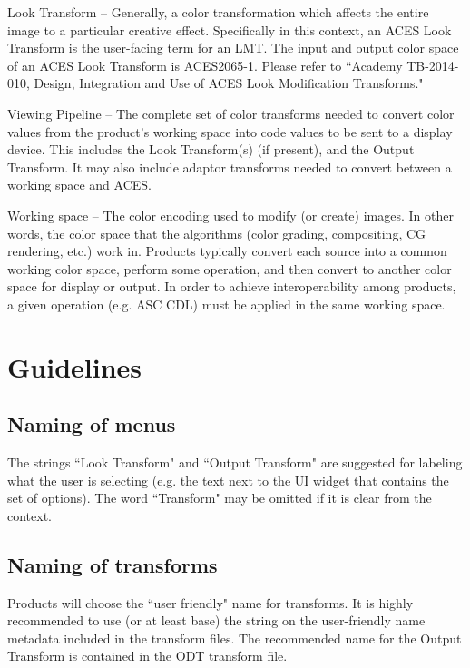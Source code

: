 Look Transform -- Generally, a color transformation which affects the entire image to a particular creative effect. Specifically in this context, an ACES Look Transform is the user-facing term for an LMT. The input and output color space of an ACES Look Transform is ACES2065-1. Please refer to ``Academy TB-2014-010, Design, Integration and Use of ACES Look Modification Transforms."

Viewing Pipeline -- The complete set of color transforms needed to convert color values from the product’s working space into code values to be sent to a display device. This includes the Look Transform(s) (if present), and the Output Transform. It may also include adaptor transforms needed to convert between a working space and ACES.

Working space -- The color encoding used to modify (or create) images. In other words, the color space that the algorithms (color grading, compositing, CG rendering, etc.) work in. Products typically convert each source into a common working color space, perform some operation, and then convert to another color space for display or output. In order to achieve interoperability among products, a given operation (e.g. ASC CDL) must be applied in the same working space.



\section{Guidelines}
\subsection{Naming of menus}
The strings ``Look Transform" and ``Output Transform" are suggested for labeling what the user is selecting (e.g. the text next to the UI widget that contains the set of options). The word ``Transform" may be omitted if it is clear from the context.

\subsection{Naming of transforms}
Products will choose the ``user friendly" name for transforms. It is highly recommended to use (or at least base) the string on the user-friendly name metadata included in the transform files. The recommended name for the Output Transform is contained in the ODT transform file. 

